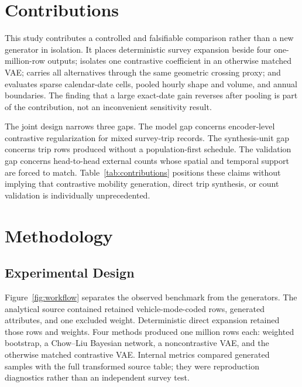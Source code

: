 \documentclass[numbered]{trbunofficial}
\newcommand{\CVAE}{contrastive VAE}
\begin{document}


\section{Contributions}

This study contributes a controlled and falsifiable comparison rather than a new generator in isolation. It places deterministic survey expansion beside four one-million-row outputs; isolates one contrastive coefficient in an otherwise matched VAE; carries all alternatives through the same geometric crossing proxy; and evaluates sparse calendar-date cells, pooled hourly shape and volume, and annual boundaries. The finding that a large exact-date gain reverses after pooling is part of the contribution, not an inconvenient sensitivity result.

The joint design narrows three gaps. The model gap concerns encoder-level contrastive regularization for mixed survey-trip records. The synthesis-unit gap concerns trip rows produced without a population-first schedule. The validation gap concerns head-to-head external counts whose spatial and temporal support are forced to match. Table~\ref{tab:contributions} positions these claims without implying that contrastive mobility generation, direct trip synthesis, or count validation is individually unprecedented.



\section{Methodology}

\subsection{Experimental Design}

Figure~\ref{fig:workflow} separates the observed benchmark from the generators. The analytical source contained \SurveyRows{} retained vehicle-mode-coded rows, \SurveyFields{} generated attributes, and one excluded weight. Deterministic direct expansion retained those rows and weights. Four methods produced one million rows each: weighted bootstrap, a Chow--Liu Bayesian network, a noncontrastive VAE, and the otherwise matched \CVAE. Internal metrics compared generated samples with the full transformed source table; they were reproduction diagnostics rather than an independent survey test.
\end{document}
